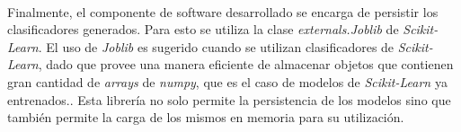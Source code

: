 \paragraph{} Finalmente, el componente de software desarrollado se encarga de persistir los clasificadores generados. Para esto se utiliza la clase \textit{externals.Joblib} de \textit{Scikit-Learn}. El uso de \textit{Joblib} es sugerido cuando se utilizan clasificadores de \textit{Scikit-Learn}, dado que provee una manera eficiente de almacenar objetos que contienen gran cantidad de \textit{arrays} de \textit{numpy}\cite{numpy}, que es el caso de modelos de \textit{Scikit-Learn} ya entrenados.\cite{persistence}. Esta librería no solo permite la persistencia de los modelos sino que también permite la carga de los mismos en memoria para su utilización.

